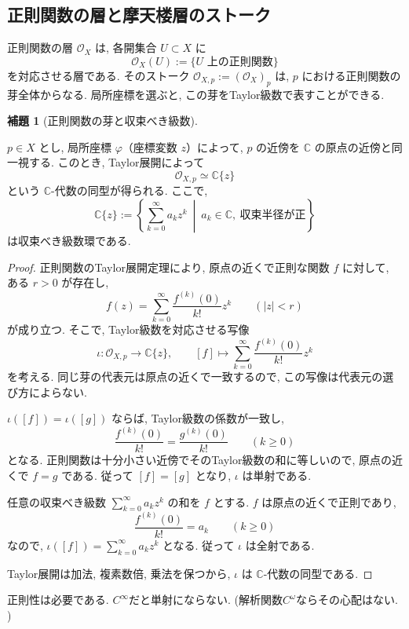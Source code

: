 \documentclass[dvipdfmx,a4paper,11pt]{article} %
\newcommand{\C}{\mathbb{C}}
\theoremstyle{definition}
\numberwithin{equation}{section}
\newtheorem{lem}[thm]{補題}
\begin{document}
\subsection{正則関数の層と摩天楼層のストーク}


正則関数の層 $\mathcal O_X$ は, 各開集合 $U\subset X$ に
\[
\mathcal O_X(U):=\{U\text{ 上の正則関数}\}
\]
を対応させる層である.
そのストーク $\mathcal O_{X,p}:=(\mathcal O_X)_p$ は, 
$p$ における正則関数の芽全体からなる.
局所座標を選ぶと, この芽をTaylor級数で表すことができる.

\begin{lem}[正則関数の芽と収束べき級数]\label{O-M190}

$p\in X$ とし, 局所座標 $\varphi$（座標変数 $z$）によって, 
$p$ の近傍を $\C$ の原点の近傍と同一視する.
このとき, Taylor展開によって
\[
\mathcal O_{X,p}\simeq\C\{z\}
\]
という $\C$-代数の同型が得られる.
ここで, 
\[
\C\{z\}
:=
\left\{
\sum_{k=0}^{\infty}a_kz^k
\ \middle|\
a_k\in\C,\ \text{収束半径が正}
\right\}
\]
は収束べき級数環である.
\end{lem}
\begin{proof}
正則関数のTaylor展開定理により, 
原点の近くで正則な関数 $f$ に対して, ある $r>0$ が存在し, 
\[
f(z)=\sum_{k=0}^{\infty}\frac{f^{(k)}(0)}{k!}z^k
\qquad(|z|<r)
\]
が成り立つ.
そこで, Taylor級数を対応させる写像
\[
\iota:\mathcal O_{X,p}\longrightarrow\C\{z\},
\qquad
[f]\longmapsto
\sum_{k=0}^{\infty}\frac{f^{(k)}(0)}{k!}z^k
\]
を考える.
同じ芽の代表元は原点の近くで一致するので, 
この写像は代表元の選び方によらない.

$\iota([f])=\iota([g])$ ならば, Taylor級数の係数が一致し,
\[
\frac{f^{(k)}(0)}{k!}=\frac{g^{(k)}(0)}{k!}
\qquad(k\geq0)
\]
となる.
正則関数は十分小さい近傍でそのTaylor級数の和に等しいので,
原点の近くで $f=g$ である.
従って $[f]=[g]$ となり, $\iota$ は単射である.

任意の収束べき級数 $\sum_{k=0}^{\infty}a_kz^k$ の和を $f$ とする.
$f$ は原点の近くで正則であり,
\[
\frac{f^{(k)}(0)}{k!}=a_k
\qquad(k\geq0)
\]
なので, $\iota([f])=\sum_{k=0}^{\infty}a_kz^k$ となる.
従って $\iota$ は全射である.

Taylor展開は加法, 複素数倍, 乗法を保つから, 
$\iota$ は $\C$-代数の同型である.
\end{proof}


正則性は必要である. $C^\infty$だと単射にならない. (解析関数$C^{\omega}$ならその心配はない. ) 
\end{document}
